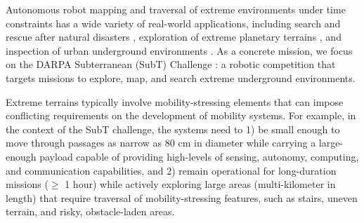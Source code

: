 \documentclass[letterpaper, 10pt, conference]{ieeeconf}      %
\newcommand{\rev}[1]{{\color{blue}#1}} %
\begin{document}
Autonomous robot mapping and traversal of extreme environments under time constraints has a wide variety of real-world applications, including search and rescue after natural disasters \cite{Nagatani2013}, exploration of extreme planetary terrains \cite{ali-agu,Taka2020JFR,Husain2013}, and inspection of urban underground environments \cite{Kolvenbach2020}. As a concrete mission, we focus on the DARPA Subterranean (SubT) Challenge \cite{subt_webpage}: a robotic competition %
that targets missions to explore, map, and search extreme underground environments.




Extreme terrains typically involve mobility-stressing elements that can impose conflicting requirements on the development of mobility systems. For example, in the context of the SubT challenge, the systems need to
1) be small enough to move through passages as narrow as 80 cm in diameter while carrying a large-enough payload capable of providing high-levels of sensing, autonomy, computing, and communication capabilities, and 2) remain operational for long-duration missions ($\geq$ 1 hour) while actively exploring large areas (multi-kilometer in length) that require traversal of mobility-stressing features, such as stairs, uneven terrain, and risky, obstacle-laden areas.
\end{document}
